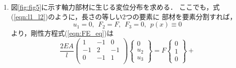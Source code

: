\documentclass[10pt,a4j]{jarticle}
\begin{document}
\begin{enumerate}
\begin{equation}
\begin{array}{cc}
		2 & -1  \\
		-1 & 1 
	\end{array}
	\right)
	\left\{
	\begin{array}{c}
		u_2 \\
		u_3
	\end{array}
	\right\}
	=
	\frac{p_0l}{4}
	\left\{
	\begin{array}{c}
		2 \\
		1 
	\end{array}
	\right\} 
	\label{eqn:}
\end{equation}
を解けば，
\begin{equation}
	u_2=\frac{3}{8}\frac{p_0l^2}{EA}, \ \ 
	u_3=\frac{1}{2}\frac{p_0l^2}{EA}
	\label{eqn:u_nd_ex1}
\end{equation}
が得られる．これを，式(\ref{eqn:FE_eq_ex1})に代入すれば，全体節点1における力
(反力が)$F_1=-p_0l$と求められる．
要素$e$における変位の近似解$\tilde u(x_e)$は，式(\ref{eqn:u_nd_ex1})を
\begin{equation}
	\tilde u(x_e) =\sum_{i=1}^2 u^e_i\phi^e_i(x_e), \ \ (0\leq x_e \leq l_e)
\end{equation}
に代入することで得られる．ここでは，変位分布を要素毎に1次式で
近似しているため，2次式で与えられる厳密解には一致し得ない．
しかしながら，部材全体の変位分布を一つの直線で
近似よりも，解の精度は向上している．
\item
図\ref{fig:fig5}に示す軸力部材に生じる変位分布を求める．
ここでも，式(\ref{eqn:l1_l2})のように，長さの等しい2つの要素に
部材を要素分割すれば，
\begin{equation}
	u_1=0, \ \ F_2=F,\ \ F_3=0, \ \ p(x)\equiv 0
\end{equation}
より，剛性方程式(\ref{eqn:FE_eq})は
\begin{equation}
	\frac{2EA}{l}
	\left(
	\begin{array}{ccc}
		1 & -1  & 0 \\
		-1 & 2 & -1 \\
		0 & -1 & 1  \\
	\end{array}
	\right)
	\left\{
	\begin{array}{c}
		0 \\
		u_2 \\
		u_3
	\end{array}
	\right\}
	=
	F
	\left\{
	\begin{array}{c}
		0 \\
		1  \\
		0  
	\end{array}
	\right\}
	+

\end{equation}
\end{enumerate}
\end{document}
